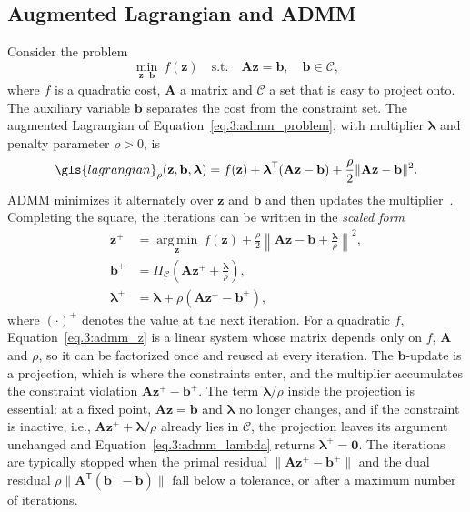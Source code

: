 \subsection{Augmented Lagrangian and ADMM}

Consider the problem
\begin{equation}
    \min_{\mathbf{z},\,\mathbf{b}}\ f(\mathbf{z})
    \quad\text{s.t.}\quad
    \mathbf{A}\mathbf{z} = \mathbf{b},\quad \mathbf{b}\in\mathcal{C},
    \label{eq.3:admm_problem}
\end{equation}
where $f$ is a quadratic cost, $\mathbf{A}$ a matrix and $\mathcal{C}$ a set that is easy to project onto. The auxiliary variable $\mathbf{b}$ separates the cost from the constraint set. The augmented Lagrangian of Equation~\eqref{eq.3:admm_problem}, with multiplier $\boldsymbol{\lambda}$ and penalty parameter $\rho>0$, is
\begin{equation}
    \gls{lagrangian}_\rho(\mathbf{z},\mathbf{b},\boldsymbol{\lambda})
    =
    f(\mathbf{z}) + \boldsymbol{\lambda}^{\mathsf T}(\mathbf{A}\mathbf{z}-\mathbf{b}) + \frac{\rho}{2}\|\mathbf{A}\mathbf{z}-\mathbf{b}\|^2 .
\end{equation}
\gls{ADMM} minimizes it alternately over $\mathbf{z}$ and $\mathbf{b}$ and then updates the multiplier~\cite{boydDistributedOptimizationStatistical2011}. Completing the square, the iterations can be written in the \emph{scaled form}
\begin{align}
    \mathbf{z}^{+} &= \operatorname*{arg\,min}_{\mathbf{z}}\ f(\mathbf{z}) + \frac{\rho}{2}\left\|\mathbf{A}\mathbf{z}-\mathbf{b}+\frac{\boldsymbol{\lambda}}{\rho}\right\|^2, \label{eq.3:admm_z}\\
    \mathbf{b}^{+} &= \Pi_{\mathcal{C}}\!\left(\mathbf{A}\mathbf{z}^{+}+\frac{\boldsymbol{\lambda}}{\rho}\right), \label{eq.3:admm_b}\\
    \boldsymbol{\lambda}^{+} &= \boldsymbol{\lambda} + \rho\left(\mathbf{A}\mathbf{z}^{+}-\mathbf{b}^{+}\right), \label{eq.3:admm_lambda}
\end{align}
where $(\cdot)^{+}$ denotes the value at the next iteration. For a quadratic $f$, Equation~\eqref{eq.3:admm_z} is a linear system whose matrix depends only on $f$, $\mathbf{A}$ and $\rho$, so it can be factorized once and reused at every iteration. The $\mathbf{b}$-update is a projection, which is where the constraints enter, and the multiplier accumulates the constraint violation $\mathbf{A}\mathbf{z}^{+}-\mathbf{b}^{+}$. The term $\boldsymbol{\lambda}/\rho$ inside the projection is essential: at a fixed point, $\mathbf{A}\mathbf{z}=\mathbf{b}$ and $\boldsymbol{\lambda}$ no longer changes, and if the constraint is inactive, i.e., $\mathbf{A}\mathbf{z}^{+}+\boldsymbol{\lambda}/\rho$ already lies in $\mathcal{C}$, the projection leaves its argument unchanged and Equation~\eqref{eq.3:admm_lambda} returns $\boldsymbol{\lambda}^{+}=\mathbf{0}$. The iterations are typically stopped when the primal residual $\|\mathbf{A}\mathbf{z}^{+}-\mathbf{b}^{+}\|$ and the dual residual $\rho\|\mathbf{A}^{\mathsf T}(\mathbf{b}^{+}-\mathbf{b})\|$ fall below a tolerance, or after a maximum number of iterations.

